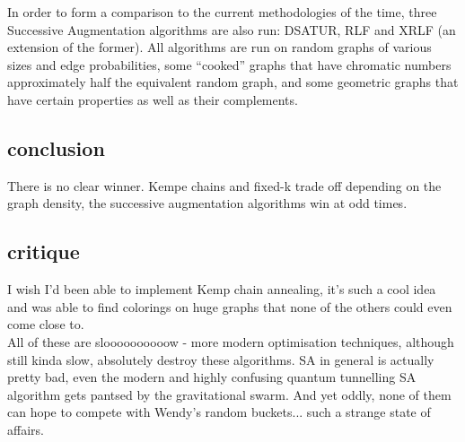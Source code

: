 In order to form a comparison to the current methodologies of the time, three Successive Augmentation algorithms are also run: DSATUR, RLF and XRLF (an extension of the former).
All algorithms are run on random graphs of various sizes and edge probabilities, some ``cooked'' graphs that have chromatic numbers approximately half the equivalent random graph, and some geometric graphs that have certain properties as well as their complements.

\subsection{conclusion}

There is no clear winner. Kempe chains and fixed-k trade off depending on the graph density, the successive augmentation algorithms win at odd times.

\subsection{critique}
I wish I'd been able to implement Kemp chain annealing, it's such a cool idea and was able to find colorings on huge graphs that none of the others could even come close to.\\
All of these are sloooooooooow - more modern optimisation techniques, although still kinda slow, absolutely destroy these algorithms. SA in general is actually pretty bad, even the modern and highly confusing quantum tunnelling SA algorithm gets pantsed by the gravitational swarm. And yet oddly, none of them can hope to compete with Wendy's random buckets... such a strange state of affairs.